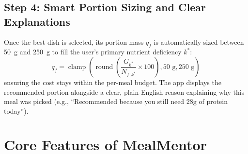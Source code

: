 \documentclass[10pt, conference, letterpaper]{IEEEtran}
\begin{document}
\subsection{Step 4: Smart Portion Sizing and Clear Explanations}
Once the best dish is selected, its portion mass $q_f$ is automatically sized between 50~g and 250~g to fill the user's primary nutrient deficiency $k^*$:
\begin{equation}
q_f = \operatorname{clamp}\left( \operatorname{round}\left( \frac{G_{k^*}}{N_{f,k^*}} \times 100 \right), 50\text{ g}, 250\text{ g} \right)
\label{eq:serving}
\end{equation}
ensuring the cost stays within the per-meal budget. The app displays the recommended portion alongside a clear, plain-English reason explaining why this meal was picked (e.g., ``Recommended because you still need 28g of protein today'').

\section{Core Features of MealMentor}
\end{document}
